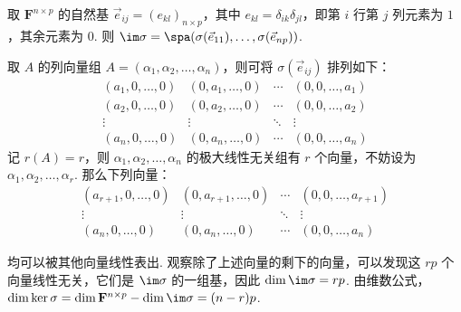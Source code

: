 \begin{exercise}
\begin{exgroup}
\begin{answer}
          取 $ \mathbf{F}^{n \times p} $ 的自然基 $ \vec{e}_{ij} = (e_{kl})_{n \times p} $，其中 $ e_{kl} = \delta_{ik} \delta_{jl} $，即第 $ i $ 行第 $ j $ 列元素为 $ 1 $，其余元素为 $ 0 $. 则 $ \im \sigma = \spa(\sigma(\vec{e}_{11}), \ldots, \sigma(\vec{e}_{np})) $.

          取 $ A $ 的列向量组 $ A = (\alpha_1, \alpha_2, \ldots, \alpha_n) $，则可将 $ \sigma(\vec{e}_{ij}) $ 排列如下：
          \[ \begin{matrix}
                  (a_1, 0, \ldots, 0) & (0, a_1, \ldots, 0) & \cdots & (0, 0, \ldots, a_1) \\
                  (a_2, 0, \ldots, 0) & (0, a_2, \ldots, 0) & \cdots & (0, 0, \ldots, a_2) \\
                  \vdots              & \vdots              & \ddots & \vdots              \\
                  (a_n, 0, \ldots, 0) & (0, a_n, \ldots, 0) & \cdots & (0, 0, \ldots, a_n)
              \end{matrix} \]
          记 $ r(A) = r $，则 $ \alpha_1, \alpha_2, \ldots, \alpha_n $ 的极大线性无关组有 $ r $ 个向量，不妨设为 $ \alpha_1, \alpha_2, \ldots, \alpha_r $. 那么下列向量：
          \[ \begin{matrix}
                  (a_{r+1}, 0, \ldots, 0) & (0, a_{r+1}, \ldots, 0) & \cdots & (0, 0, \ldots, a_{r+1}) \\
                  \vdots                  & \vdots                  & \ddots & \vdots                  \\
                  (a_n, 0, \ldots, 0)     & (0, a_n, \ldots, 0)     & \cdots & (0, 0, \ldots, a_n)
              \end{matrix} \]

          均可以被其他向量线性表出. 观察除了上述向量的剩下的向量，可以发现这 $ rp $ 个向量线性无关，它们是 $ \im \sigma $ 的一组基，因此 $ \dim \im \sigma = rp $. 由维数公式，$ \dim \ker \sigma = \dim \mathbf{F}^{n \times p} - \dim \im \sigma = (n - r)p $.
        \end{answer}
    \end{exgroup}
\end{exercise}
